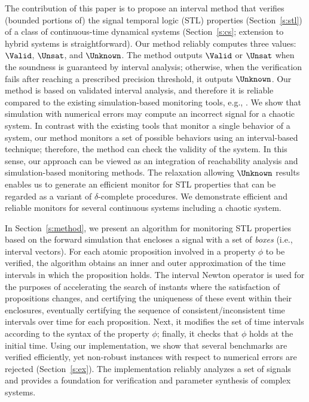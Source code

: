 \documentclass[paper]{ieice}
\begin{document}
The contribution of this paper is to propose an interval method that verifies (bounded portions of) the signal temporal logic (STL) properties (Section~\ref{s:stl}) of a class of continuous-time dynamical systems (Section~\ref{s:cs}; extension to hybrid systems is straightforward).
Our method reliably computes three values: $\Valid$, $\Unsat$, and $\Unknown$. The method outputs $\Valid$ or $\Unsat$ when the soundness is guaranteed by interval analysis;
otherwise, when the verification fails after reaching a prescribed precision threshold, it outputs $\Unknown$.
Our method is based on validated interval analysis, and therefore it is reliable compared to the existing simulation-based monitoring tools, e.g., \cite{Maler2003,Fainekos2006a,Donze2010,Donze2010a}.
We show that simulation with numerical errors may compute an incorrect signal for a chaotic system.
In contrast with the existing tools that monitor a single behavior of a system,
our method monitors a set of possible behaviors using an interval-based technique;
therefore, the method can check the validity of the system.
In this sense, our approach can be viewed as an integration of reachability analysis and simulation-based monitoring methods.
The relaxation allowing $\Unknown$ results enables us to generate an efficient monitor for STL properties that can be regarded as a variant of $\delta$-complete procedures.
We demonstrate efficient and reliable monitors for several continuous systems including a chaotic system.

In Section~\ref{s:method}, we present an algorithm for monitoring STL properties based on the forward simulation that encloses a signal with a set of \emph{boxes} (i.e., interval vectors). 
For each atomic proposition involved in a property $\phi$ to be verified, the algorithm obtains an inner and outer approximation of the time intervals in which the proposition holds. The interval Newton operator is used for the purposes of accelerating the search of instants where the satisfaction of propositions changes, and certifying the uniqueness of these event within their enclosures, eventually certifying the sequence of consistent/inconsistent time intervals over time for each proposition.
Next, it modifies the set of time intervals according to the syntax of the property $\phi$; finally, it checks that $\phi$ holds at the initial time.
Using our implementation, we show that several benchmarks are verified efficiently, yet non-robust instances with respect to numerical errors are rejected (Section~\ref{s:ex}).
The implementation reliably analyzes a set of signals and provides a foundation for verification and parameter synthesis of complex systems.
\end{document}
